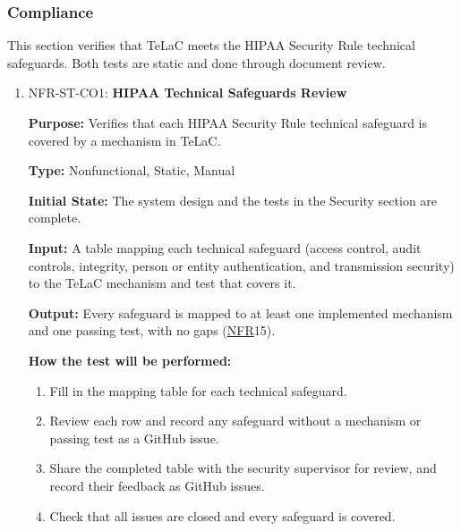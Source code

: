 \documentclass[12pt, titlepage]{article}
\newcommand{\srsnfr}[1]{\href{https://github.com/Nour-Fawaz/MacaBoca/blob/main/pdfs/SRS/SRS.pdf}{NFR}}
\renewcommand{\_}{\oldunderscore\allowbreak}
\begin{document}
\subsubsection{Compliance}
This section verifies that TeLaC meets the HIPAA Security Rule technical safeguards. Both tests are static and done through document review.
\begin{enumerate}
  \item NFR-ST-CO1: \textbf{HIPAA Technical Safeguards Review\\}
  \begin{mdframed}[linewidth=0.5mm]
      \textbf{Purpose:} Verifies that each HIPAA Security Rule technical safeguard is covered by a mechanism in TeLaC. \par
      \textbf{Type:} Nonfunctional, Static, Manual \par
      \textbf{Initial State:} The system design and the tests in the Security section are complete. \par
      \textbf{Input:} A table mapping each technical safeguard (access control, audit controls, integrity, person or entity authentication, and transmission security) to the TeLaC mechanism and test that covers it. \par
      \textbf{Output:} Every safeguard is mapped to at least one implemented mechanism and one passing test, with no gaps (\srsnfr*{15}). \par
      \textbf{How the test will be performed:}
      \begin{enumerate}
      \item[1.] Fill in the mapping table for each technical safeguard.
      \item[2.] Review each row and record any safeguard without a mechanism or passing test as a GitHub issue.
      \item[3.] Share the completed table with the security supervisor for review, and record their feedback as GitHub issues.
      \item[4.] Check that all issues are closed and every safeguard is covered.
      \end{enumerate}
  \end{mdframed}


\end{enumerate}
\end{document}
